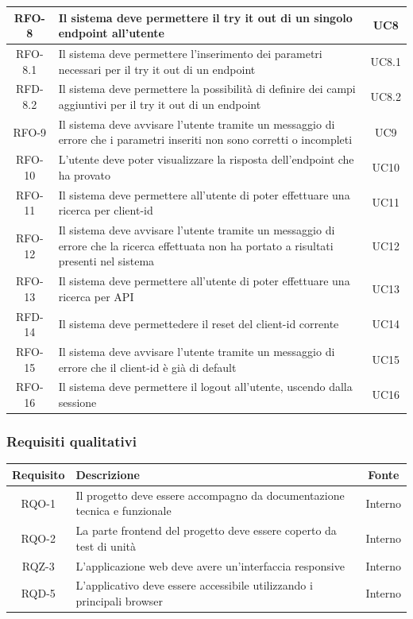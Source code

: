 \begin{center}
\begin{longtable}{|c|p{}|c|}
\hline
RFO-8 &Il sistema deve permettere il try it out di un singolo endpoint all'utente & UC8 \\
\hline
RFO-8.1 &Il sistema deve permettere l'inserimento dei parametri necessari per il try it out di un endpoint & UC8.1 \\
\hline
RFD-8.2 &Il sistema deve permettere la possibilità di definire dei campi aggiuntivi per il try it out di un endpoint & UC8.2 \\
\hline
RFO-9 &Il sistema deve avvisare l'utente tramite un messaggio di errore che i parametri inseriti non sono corretti o incompleti & UC9 \\
\hline
RFO-10 &L'utente deve poter visualizzare la risposta dell'endpoint che ha provato & UC10 \\
\hline
RFO-11 &Il sistema deve permettere all'utente di poter effettuare una ricerca per client-id & UC11 \\
\hline
RFO-12 &Il sistema deve avvisare l'utente tramite un messaggio di errore che la ricerca effettuata non ha portato a risultati presenti nel sistema & UC12 \\
\hline
RFO-13 &Il sistema deve permettere all'utente di poter effettuare una ricerca per API & UC13 \\
\hline
RFD-14 &Il sistema deve permettedere il reset del client-id corrente & UC14 \\
\hline
RFO-15 &Il sistema deve avvisare l'utente tramite un messaggio di errore che il client-id è già di default & UC15 \\
\hline
RFO-16 &Il sistema deve permettere il logout all'utente, uscendo dalla sessione  & UC16 \\
\hline
\end{longtable}
\end{center}

\subsubsection{Requisiti qualitativi}


\begin{center}
\label{tab:requisiti-qualitativi}
\begin{longtable}{|c|p{}|c|}
\hline
\textbf{Requisito} & \textbf{Descrizione} & \textbf{Fonte}\\
\hline
RQO-1 &Il progetto deve essere accompagno da documentazione tecnica e funzionale & Interno \\
\hline
RQO-2 &La parte frontend del progetto deve essere coperto da test di unità & Interno \\
\hline
RQZ-3 &L'applicazione web deve avere un'interfaccia responsive & Interno \\
\hline
RQD-5 &L'applicativo deve essere accessibile utilizzando i principali browser & Interno \\
\hline
\end{longtable}
\end{center}


